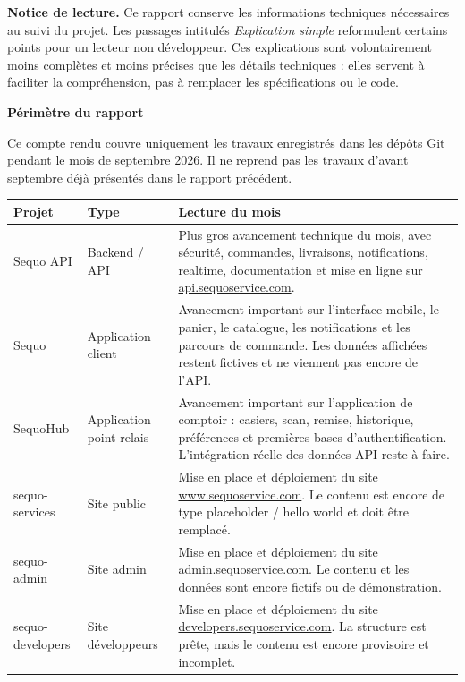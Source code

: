 \documentclass[11pt,letterpaper]{article}
\newcommand{\sectiontitle}[1]{%
  \vspace{0.55em}
  {\Large\bfseries\color{SequoInk}#1}\par
  \vspace{0.1em}
}
\begin{document}
\begin{titlepage}
  \vspace{0.55cm}
  {\small
  \textbf{Notice de lecture.} Ce rapport conserve les informations techniques nécessaires au suivi du projet. Les passages intitulés \textit{Explication simple} reformulent certains points pour un lecteur non développeur. Ces explications sont volontairement moins complètes et moins précises que les détails techniques : elles servent à faciliter la compréhension, pas à remplacer les spécifications ou le code.
  }
\end{titlepage}

\pagestyle{fancy}

\sectiontitle{Périmètre du rapport}
Ce compte rendu couvre uniquement les travaux enregistrés dans les dépôts Git pendant le mois de septembre 2026. Il ne reprend pas les travaux d'avant septembre déjà présentés dans le rapport précédent.

{\small
\begin{tabularx}{\linewidth}{@{}L{3.1cm}L{4.5cm}Y@{}}
\toprule
{}
\textbf{Projet} & \textbf{Type} & \textbf{Lecture du mois} \\
\midrule
Sequo API & Backend / API & Plus gros avancement technique du mois, avec sécurité, commandes, livraisons, notifications, realtime, documentation et mise en ligne sur \href{https://api.sequoservice.com}{api.sequoservice.com}. \\
Sequo & Application client & Avancement important sur l'interface mobile, le panier, le catalogue, les notifications et les parcours de commande. Les données affichées restent fictives et ne viennent pas encore de l'API. \\
SequoHub & Application point relais & Avancement important sur l'application de comptoir : casiers, scan, remise, historique, préférences et premières bases d'authentification. L'intégration réelle des données API reste à faire. \\
sequo-services & Site public & Mise en place et déploiement du site \href{https://www.sequoservice.com}{www.sequoservice.com}. Le contenu est encore de type placeholder / hello world et doit être remplacé. \\
sequo-admin & Site admin & Mise en place et déploiement du site \href{https://admin.sequoservice.com}{admin.sequoservice.com}. Le contenu et les données sont encore fictifs ou de démonstration. \\
sequo-developers & Site développeurs & Mise en place et déploiement du site \href{https://developers.sequoservice.com}{developers.sequoservice.com}. La structure est prête, mais le contenu est encore provisoire et incomplet. \\
\bottomrule
\end{tabularx}
}
\end{document}
